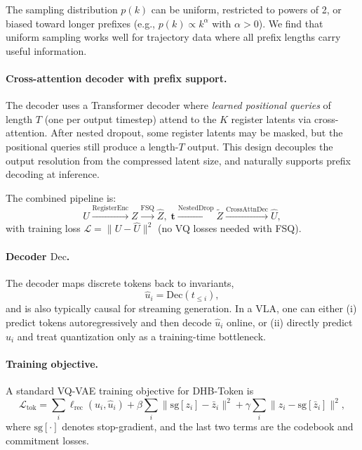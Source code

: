 \documentclass[11pt]{article}
\begin{document}
The sampling distribution $p(k)$ can be uniform, restricted to powers of 2, or biased toward longer prefixes (e.g., $p(k)\propto k^{\alpha}$ with $\alpha>0$). We find that uniform sampling works well for trajectory data where all prefix lengths carry useful information.

\paragraph{Cross-attention decoder with prefix support.}
The decoder uses a Transformer decoder where \emph{learned positional queries} of length $T$ (one per output timestep) attend to the $K$ register latents via cross-attention. After nested dropout, some register latents may be masked, but the positional queries still produce a length-$T$ output. This design decouples the output resolution from the compressed latent size, and naturally supports prefix decoding at inference.

The combined pipeline is:
\begin{equation}
  U \xrightarrow{\mathrm{RegisterEnc}} Z \xrightarrow{\mathrm{FSQ}} \hat Z,\; \bm{t} \xrightarrow{\mathrm{NestedDrop}} \tilde Z \xrightarrow{\mathrm{CrossAttnDec}} \hat U,
\end{equation}
with training loss $\mathcal{L}=\lVert U-\hat U\rVert^2$ (no VQ losses needed with FSQ).

\paragraph{Decoder $\mathrm{Dec}$.}
The decoder maps discrete tokens back to invariants,
\begin{equation}
  \hat u_i = \mathrm{Dec}(t_{\le i}),
\end{equation}
and is also typically causal for streaming generation. In a VLA, one can either (i) predict tokens autoregressively and then decode $\hat u_i$ online, or (ii) directly predict $\hat u_i$ and treat quantization only as a training-time bottleneck.

\paragraph{Training objective.}
A standard VQ-VAE training objective for DHB-Token is
\begin{equation}
  \mathcal{L}_{\mathrm{tok}} = \sum_i \ell_{\mathrm{rec}}(u_i,\hat u_i)
  + \beta \sum_i \lVert \mathrm{sg}[z_i] - \bar z_i\rVert^2
  + \gamma \sum_i \lVert z_i - \mathrm{sg}[\bar z_i]\rVert^2,
\end{equation}
where $\mathrm{sg}[\cdot]$ denotes stop-gradient, and the last two terms are the codebook and commitment losses.
\end{document}
